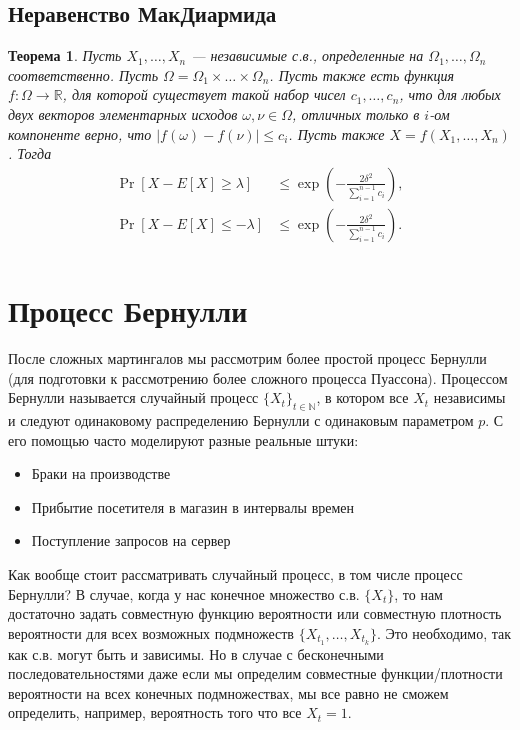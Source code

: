 \documentclass[12pt]{article}
\newcommand\N{\mathbb{N}}
\newcommand\R{\mathbb{R}}
\newtheorem{theorem}{Теорема}
\begin{document}
\subsection{Неравенство МакДиармида}

\begin{theorem}
  Пусть $X_1, \dots, X_n$ --- независимые с.в., определенные на $\Omega_1, \dots, \Omega_n$ соответственно. Пусть $\Omega = \Omega_1 \times \dots \times \Omega_n$. Пусть также есть функция $f: \Omega \to \R$, для которой существует такой набор чисел $c_1, \dots, c_n$, что для любых двух векторов элементарных исходов $\omega, \nu \in \Omega$, отличных только в $i$-ом компоненте верно, что $|f(\omega) - f(\nu)| \le c_i$. Пусть также $X = f(X_1, \dots, X_n)$. Тогда
  \begin{align*}
    \Pr[X - E[X] \ge \lambda] &\le \exp\left(-\frac{2\delta^2}{\sum_{i = 1}^{n - 1}c_i}\right), \\
    \Pr[X - E[X] \le -\lambda] &\le \exp\left(-\frac{2\delta^2}{\sum_{i = 1}^{n - 1}c_i}\right). \\
  \end{align*}
\end{theorem}

\section{Процесс Бернулли}

После сложных мартингалов мы рассмотрим более простой процесс Бернулли (для подготовки к рассмотрению более сложного процесса Пуассона). Процессом Бернулли называется случайный процесс $\{X_t\}_{t \in \N}$, в котором все $X_t$ независимы и следуют одинаковому распределению Бернулли с одинаковым параметром $p$. С его помощью часто моделируют разные реальные штуки:
\begin{itemize}
  \item Браки на производстве
  \item Прибытие посетителя в магазин в интервалы времен
  \item Поступление запросов на сервер
\end{itemize}

Как вообще стоит рассматривать случайный процесс, в том числе процесс Бернулли? В случае, когда у нас конечное множество с.в. $\{X_t\}$, то нам достаточно задать совместную функцию вероятности или совместную плотность вероятности для всех возможных подмножеств $\{X_{t_1}, \dots, X_{t_k}\}$. Это необходимо, так как с.в. могут быть и зависимы. Но в случае с бесконечными последовательностями даже если мы определим совместные функции/плотности вероятности на всех конечных подмножествах, мы все равно не сможем определить, например, вероятность того что все $X_t = 1$.
\end{document}
